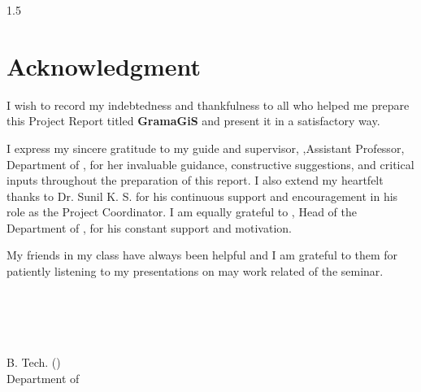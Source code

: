 \newpage
{}
\thispagestyle{empty}
\begin{spacing}{1.5}
%
\chapter*{Acknowledgment}

I wish to record my indebtedness and thankfulness 
to all who helped me prepare this Project Report titled 
\textbf{GramaGiS} and present it in a satisfactory way. 

I express my sincere gratitude to my guide and supervisor, \vguide,Assistant Professor, Department of \vdept, for her invaluable guidance, constructive suggestions, and critical inputs throughout the preparation of this report. I also extend my heartfelt thanks to Dr. Sunil K. S. for his continuous support and encouragement in his role as the Project Coordinator. I am equally grateful to \vhod, Head of the Department of \vdept, for his constant support and motivation.


My friends in my class have always been helpful and I am grateful to them for patiently listening to my presentations on may work related of the seminar. 


\begin{flushright}
\vname\\

\vnamei\\

\vnameii\\

\vnameiii\\

B. Tech. (\vspecialization)\\
Department of \vdept\\
\vcollege\ 
\end{flushright}



\end{spacing}  
